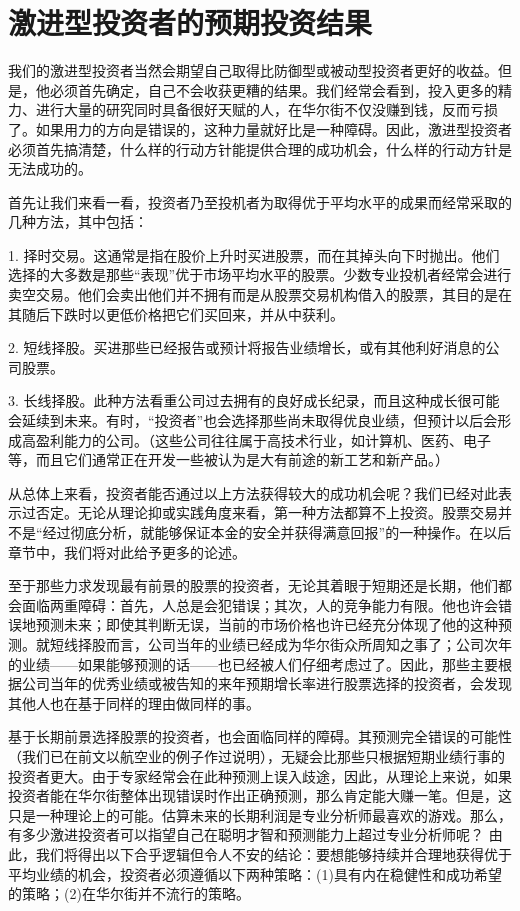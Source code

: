 \documentclass[12pt,oneside]{book}
\begin{document}
\section{激进型投资者的预期投资结果}
我们的激进型投资者当然会期望自己取得比防御型或被动型投资者更好的收益。但是，他必须首先确定，自己不会收获更糟的结果。我们经常会看到，投入更多的精力、进行大量的研究同时具备很好天赋的人，在华尔街不仅没赚到钱，反而亏损了。如果用力的方向是错误的，这种力量就好比是一种障碍。因此，激进型投资者必须首先搞清楚，什么样的行动方针能提供合理的成功机会，什么样的行动方针是无法成功的。

首先让我们来看一看，投资者乃至投机者为取得优于平均水平的成果而经常采取的几种方法，其中包括：

1. 择时交易。这通常是指在股价上升时买进股票，而在其掉头向下时抛出。他们选择的大多数是那些“表现”优于市场平均水平的股票。少数专业投机者经常会进行卖空交易。他们会卖出他们并不拥有而是从股票交易机构借入的股票，其目的是在其随后下跌时以更低价格把它们买回来，并从中获利。

2. 短线择股。买进那些已经报告或预计将报告业绩增长，或有其他利好消息的公司股票。

3. 长线择股。此种方法看重公司过去拥有的良好成长纪录，而且这种成长很可能会延续到未来。有时，“投资者”也会选择那些尚未取得优良业绩，但预计以后会形成高盈利能力的公司。（这些公司往往属于高技术行业，如计算机、医药、电子等，而且它们通常正在开发一些被认为是大有前途的新工艺和新产品。）

从总体上来看，投资者能否通过以上方法获得较大的成功机会呢？我们已经对此表示过否定。无论从理论抑或实践角度来看，第一种方法都算不上投资。股票交易并不是“经过彻底分析，就能够保证本金的安全并获得满意回报”的一种操作。在以后章节中，我们将对此给予更多的论述。

至于那些力求发现最有前景的股票的投资者，无论其着眼于短期还是长期，他们都会面临两重障碍：首先，人总是会犯错误；其次，人的竞争能力有限。他也许会错误地预测未来；即使其判断无误，当前的市场价格也许已经充分体现了他的这种预测。就短线择股而言，公司当年的业绩已经成为华尔街众所周知之事了；公司次年的业绩——如果能够预测的话——也已经被人们仔细考虑过了。因此，那些主要根据公司当年的优秀业绩或被告知的来年预期增长率进行股票选择的投资者，会发现其他人也在基于同样的理由做同样的事。

基于长期前景选择股票的投资者，也会面临同样的障碍。其预测完全错误的可能性（我们已在前文以航空业的例子作过说明），无疑会比那些只根据短期业绩行事的投资者更大。由于专家经常会在此种预测上误入歧途，因此，从理论上来说，如果投资者能在华尔街整体出现错误时作出正确预测，那么肯定能大赚一笔。但是，这只是一种理论上的可能。估算未来的长期利润是专业分析师最喜欢的游戏。那么，有多少激进投资者可以指望自己在聪明才智和预测能力上超过专业分析师呢？
由此，我们将得出以下合乎逻辑但令人不安的结论：要想能够持续并合理地获得优于平均业绩的机会，投资者必须遵循以下两种策略：(1)具有内在稳健性和成功希望的策略；(2)在华尔街并不流行的策略。
\end{document}
